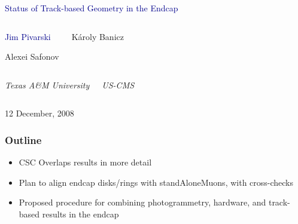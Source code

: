 \documentclass[compress]{beamer}
\begin{document}
\begin{frame}
\vfill
\begin{center}
\textcolor{darkblue}{\Large Status of Track-based Geometry in the Endcap}

\vfill
\begin{columns}
\begin{center}
\large
\textcolor{darkblue}{Jim Pivarski}

\vspace{0.2 cm}
Alexei Safonov
\end{center}

\begin{center}
\large
K\'aroly Banicz
\end{center}
\end{columns}

\begin{columns}
\begin{center}
\scriptsize
{\it Texas A\&M University}
\end{center}
\begin{center}
\scriptsize
{\it US-CMS}
\end{center}
\end{columns}

\vfill
12 December, 2008

\end{center}
\end{frame}


\small

\begin{frame}
\frametitle{Outline}
\begin{itemize}\setlength{\itemsep}{0.75 cm}
\item CSC Overlaps results in more detail
\item Plan to align endcap disks/rings with standAloneMuons, with cross-checks
\item Proposed procedure for combining photogrammetry, hardware, and
  track-based results in the endcap
\end{itemize}

\vfill
\mbox{ }
\end{frame}
\end{document}
